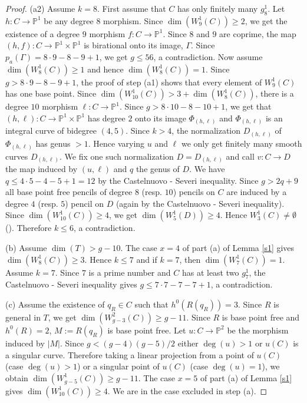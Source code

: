 \documentclass{amsart}
\theoremstyle{plain}
\theoremstyle{definition}
\begin{document}
\begin{proof}
\quad (a2) Assume $k=8$. First assume that $C$ has only finitely many $g^1_8$. Let $h: C\to \mathbb {P}^1$ be any degree $8$ morphism. Since $\dim (W^1_{9}({C})) \ge 2$, we get the existence
of a degree $9$ morphism $f: C \to \mathbb {P}^1$. Since $8$ and $9$ are coprime,  the map $(h,f): C\to \mathbb {P}^1\times \mathbb {P}^1$ is birational onto its image, $\Gamma$. Since
$p_a(\Gamma ) =8\cdot 9-8-9+1$, we get $g\le 56$, a contradiction. Now assume $\dim (W^1_8({C})) \ge 1$ and hence $\dim (W^1_8({C}))=1$. Since $g > 8\cdot 9-8-9+1$, the proof of step (a1) shows that every element of $W^1_9({C})$ has one base point. Since $\dim (W^1_{10}({C})) > 3 + \dim (W^1_8({C}))$, there
is a degree $10$ morphism $\ell : C\to \mathbb {P}^1$.
Since $g > 8\cdot 10 -8-10+1$, we get that $(h,\ell ): C\to \mathbb {P}^1\times \mathbb {P}^1$ has degree $2$ onto its image $\Phi _{(h,\ell )}$ and $\Phi _{(h,\ell )}$ is an integral curve
of bidegree $(4,5)$. Since $k>4$, the normalization $D_{(h,\ell )}$ of $\Phi _{(h,\ell )}$ has genus $>1$. Hence varying $u$ and $\ell$ we only get finitely many smooth curves
$D_{(h,\ell )}$.
We fix one such normalization $D = D_{(h,\ell )}$ and call $v: C\to D$ the map induced by $(u,\ell )$ and $q$ the genus of $D$. We have $q\le 4\cdot 5-4-5+1 =12$ by the Castelnuovo - Severi inequality.
Since $g>2q+9$ all base point free pencils of degree $8$ (resp. $10$)
pencils on $C$ are induced by a degree $4$ (resp. $5$) pencil on $D$ (again by the Castelnuovo - Severi inequality). Since $\dim (W^1_{10}({C})) \ge 4$, we get
$\dim (W^1_5({D})) \ge 4$. Hence $W^1_3({C}) \ne \emptyset$ (\cite{fhl}). Therefore $k\le 6$, a contradiction.

\quad (b) Assume $\dim (T) >g-10$. The case $x=4$ of part (a) of Lemma \ref{s1} gives $\dim (W^1_8({C})) \ge 3$. Hence $k\le 7$ and if $k=7$, then $\dim (W^1_7({C}))=1$.
 Assume $k=7$. Since $7$ is a prime number and $C$ has at least two $g^1_7$, the Castelnuovo - Severi inequality gives $g\le 7\cdot 7-7-7+1$, a contradiction.


\quad ({c}) Assume the existence of $q_R\in C$ such that  $h^0(R(q_R)) =3$. Since $R$ is general in $T$, we get $\dim (W^2_{g-3}({C})) \ge g-11$.
Since $R$ is base point free and $h^0({R}) =2$, $M:= R(q_R)$ is base point free. Let $u: C\to \mathbb {P}^2$ be the morphism induced by $|M|$. Since
$g < (g-4)(g-5)/2$ either $\deg (u) >1$ or $u({C})$ is a singular curve. Therefore taking a linear projection from a point of $u({C})$ (case $\deg (u)>1$)
or a singular point of $u({C})$ (case $\deg (u) =1$), we obtain $\dim (W^1_{g-5}({C})) \ge g-11$. The case $x=5$ of part (a) of Lemma \ref{s1} gives $\dim (W^1_{10}({C})) \ge 4$.
We are in the case excluded in step (a).
\end{proof}
\end{document}
